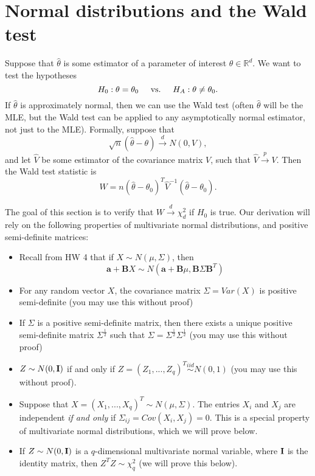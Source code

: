 \documentclass[11pt]{article}
\begin{document}
\section*{Normal distributions and the Wald test}

Suppose that $\widehat{\theta}$ is some estimator of a parameter of interest $\theta \in \mathbb{R}^d$. We want to test the hypotheses
$$H_0: \theta = \theta_0 \hspace{0.5cm} \text{vs.} \hspace{0.5cm} H_A: \theta \neq \theta_0.$$
If $\widehat{\theta}$ is approximately normal, then we can use the Wald test (often $\widehat{\theta}$ will be the MLE, but the Wald test can be applied to any asymptotically normal estimator, not just to the MLE). Formally, suppose that
$$\sqrt{n}(\widehat{\theta} - \theta) \overset{d}{\to} N(0, V),$$
and let $\widehat{V}$ be some estimator of the covariance matrix $V$, such that $\widehat{V} \overset{p}{\to} V$. Then the Wald test statistic is
$$W = n(\widehat{\theta} - \theta_0)^T \widehat{V}^{-1} (\widehat{\theta} - \theta_0).$$

\vspace{0.5cm}

\noindent The goal of this section is to verify that $W \overset{d}{\to} \chi^2_d$ if $H_0$ is true. Our derivation will rely on the following properties of multivariate normal distributions, and positive semi-definite matrices:

\begin{itemize}
\item Recall from HW 4 that if $X \sim N(\mu, \Sigma)$, then
$$\bm{a} + \bm{B} X \sim N(\bm{a} + \bm{B} \mu, \bm{B} \Sigma \bm{B}^T)$$

\item For any random vector $X$, the covariance matrix $\Sigma = Var(X)$ is positive semi-definite (you may use this without proof)

\item If $\Sigma$ is a positive semi-definite matrix, then there exists a unique positive semi-definite matrix $\Sigma^{\frac{1}{2}}$ such that $\Sigma = \Sigma^{\frac{1}{2}} \Sigma^{\frac{1}{2}}$ (you may use this without proof)

\item $Z \sim N(0, {\bf I})$ if and only if $Z = (Z_1,...,Z_q)^T \overset{iid}{\sim} N(0, 1)$ (you may use this without proof).

\item Suppose that $X = (X_1,...,X_q)^T \sim N(\mu, \Sigma)$. The entries $X_i$ and $X_j$ are independent \textit{if and only} if $\Sigma_{ij} = Cov(X_i, X_j) = 0$. This is a special property of multivariate normal distributions, which we will prove below.

\item If $Z \sim N(0, {\bf I})$ is a $q$-dimensional multivariate normal variable, where ${\bf I}$ is the identity matrix, then $Z^TZ \sim \chi^2_q$ (we will prove this below).

\end{itemize}
\end{document}

